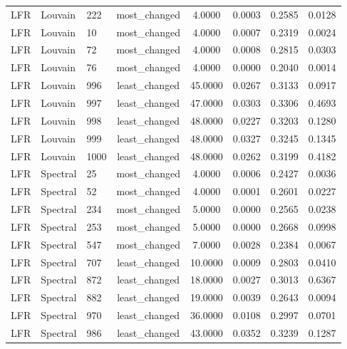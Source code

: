 \begin{longtable}{lllccccc}
LFR & Louvain & 222 & most\_changed & 4.0000 & 0.0003 & 0.2585 & 0.0128 \\
LFR & Louvain & 10 & most\_changed & 4.0000 & 0.0007 & 0.2319 & 0.0024 \\
LFR & Louvain & 72 & most\_changed & 4.0000 & 0.0008 & 0.2815 & 0.0303 \\
LFR & Louvain & 76 & most\_changed & 4.0000 & 0.0000 & 0.2040 & 0.0014 \\
LFR & Louvain & 996 & least\_changed & 45.0000 & 0.0267 & 0.3133 & 0.0917 \\
LFR & Louvain & 997 & least\_changed & 47.0000 & 0.0303 & 0.3306 & 0.4693 \\
LFR & Louvain & 998 & least\_changed & 48.0000 & 0.0227 & 0.3203 & 0.1280 \\
LFR & Louvain & 999 & least\_changed & 48.0000 & 0.0327 & 0.3245 & 0.1345 \\
LFR & Louvain & 1000 & least\_changed & 48.0000 & 0.0262 & 0.3199 & 0.4182 \\
LFR & Spectral & 25 & most\_changed & 4.0000 & 0.0006 & 0.2427 & 0.0036 \\
LFR & Spectral & 52 & most\_changed & 4.0000 & 0.0001 & 0.2601 & 0.0227 \\
LFR & Spectral & 234 & most\_changed & 5.0000 & 0.0000 & 0.2565 & 0.0238 \\
LFR & Spectral & 253 & most\_changed & 5.0000 & 0.0000 & 0.2668 & 0.0998 \\
LFR & Spectral & 547 & most\_changed & 7.0000 & 0.0028 & 0.2384 & 0.0067 \\
LFR & Spectral & 707 & least\_changed & 10.0000 & 0.0009 & 0.2803 & 0.0410 \\
LFR & Spectral & 872 & least\_changed & 18.0000 & 0.0027 & 0.3013 & 0.6367 \\
LFR & Spectral & 882 & least\_changed & 19.0000 & 0.0039 & 0.2643 & 0.0094 \\
LFR & Spectral & 970 & least\_changed & 36.0000 & 0.0108 & 0.2997 & 0.0701 \\
LFR & Spectral & 986 & least\_changed & 43.0000 & 0.0352 & 0.3239 & 0.1287 \\
\end{longtable}
